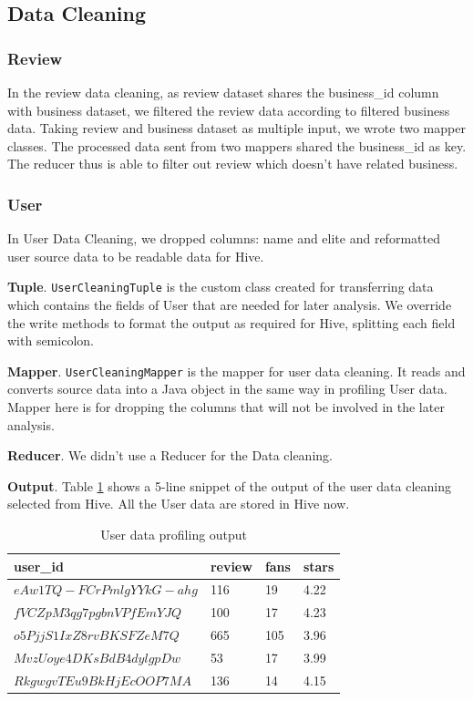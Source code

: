 \documentclass{stylefiles/capstone}
\begin{document}
\subsection{Data Cleaning}
\subsubsection{\textbf{Review}}

In the review data cleaning, as review dataset shares the business\_id column with business dataset, we filtered the review data according to filtered business data. Taking review and business dataset as multiple input, we wrote two mapper classes. The processed data sent from two mappers shared the business\_id as key. The reducer thus is able to filter out review which doesn't have related business. 

\subsubsection{\textbf{User}}

In User Data Cleaning, we dropped columns: name and elite and reformatted user source data to be readable data for Hive.

\textbf{Tuple}.
\texttt{UserCleaningTuple} is the custom class created for transferring data which contains the fields of User that are needed for later analysis. We override the write methods to format the output as required for Hive, splitting each field with semicolon.

\textbf{Mapper}.
\texttt{UserCleaningMapper} is the mapper for user data cleaning. It reads and converts source data into a Java object in the same way in profiling User data. Mapper here is for dropping the columns that will not be involved in the later analysis.

\textbf{Reducer}.
We didn't use a Reducer for the Data cleaning.

\textbf{Output}.
Table \ref{user_clean_table} shows a 5-line snippet of the output of the user data cleaning selected from Hive. All the User data are stored in Hive now.
\begin{table}[h!]
\centering
\begin{tabular}{llll} 
 \hline
user\_id & review & fans & stars   \\ [0.5ex] 
 \hline
$ eAw1TQ-FCrPmlgYYkG-ahg $ & 116 & 19 & 4.22 \\
$ fVCZpM3qg7pgbnVPfEmYJQ $ & 100 & 17 & 4.23  \\
$ o5PjjS1IxZ8rvBKSFZeM7Q $ & 665 & 105 & 3.96  \\
$ MvzUoye4DKsBdB4dylgpDw $ & 53 & 17 & 3.99  \\
$ RkgwgvTEu9BkHjEcOOP7MA $ & 136 & 14 & 4.15  \\
 \hline
\end{tabular}
\caption{User data profiling output}

\label{user_clean_table}
\end{table}
\end{document}
